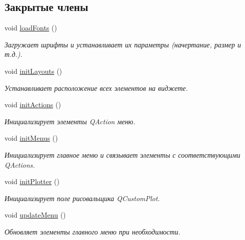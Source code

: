 \subsection*{Закрытые члены}
\begin{DoxyCompactItemize}
\item 
void \hyperlink{class_graph_window_ad4d4842869a043556a275ba06acd816b}{load\+Fonts} ()
\begin{DoxyCompactList}\small\item\em Загружает шрифты и устанавливает их параметры (начертание, размер и т.\+д.). \end{DoxyCompactList}\item 
\hypertarget{class_graph_window_ad793717ed7de5d225e90c8ebe29474e3}{}\label{class_graph_window_ad793717ed7de5d225e90c8ebe29474e3} 
void \hyperlink{class_graph_window_ad793717ed7de5d225e90c8ebe29474e3}{init\+Layouts} ()
\begin{DoxyCompactList}\small\item\em Устанавливает расположение всех элементов на виджете. \end{DoxyCompactList}\item 
\hypertarget{class_graph_window_a5c8eb0b2281c1d099b5fbe0dc4d8081e}{}\label{class_graph_window_a5c8eb0b2281c1d099b5fbe0dc4d8081e} 
void \hyperlink{class_graph_window_a5c8eb0b2281c1d099b5fbe0dc4d8081e}{init\+Actions} ()
\begin{DoxyCompactList}\small\item\em Инициализирует элементы Q\+Action меню. \end{DoxyCompactList}\item 
\hypertarget{class_graph_window_aaac43b54c4d10097e161dea8f3280f11}{}\label{class_graph_window_aaac43b54c4d10097e161dea8f3280f11} 
void \hyperlink{class_graph_window_aaac43b54c4d10097e161dea8f3280f11}{init\+Menus} ()
\begin{DoxyCompactList}\small\item\em Инициализирует главное меню и связывает элементы с соответствующими Q\+Actions. \end{DoxyCompactList}\item 
\hypertarget{class_graph_window_af9dac0c26f2353aa799075ca0d710490}{}\label{class_graph_window_af9dac0c26f2353aa799075ca0d710490} 
void \hyperlink{class_graph_window_af9dac0c26f2353aa799075ca0d710490}{init\+Plotter} ()
\begin{DoxyCompactList}\small\item\em Инициализирует поле рисовальщика Q\+Custom\+Plot. \end{DoxyCompactList}\item 
\hypertarget{class_graph_window_a91cd37369dcf09153d6088686dc720b1}{}\label{class_graph_window_a91cd37369dcf09153d6088686dc720b1} 
void \hyperlink{class_graph_window_a91cd37369dcf09153d6088686dc720b1}{update\+Menu} ()
\begin{DoxyCompactList}\small\item\em Обновляет элементы главного меню при необходимости. \end{DoxyCompactList}\end{DoxyCompactItemize}
